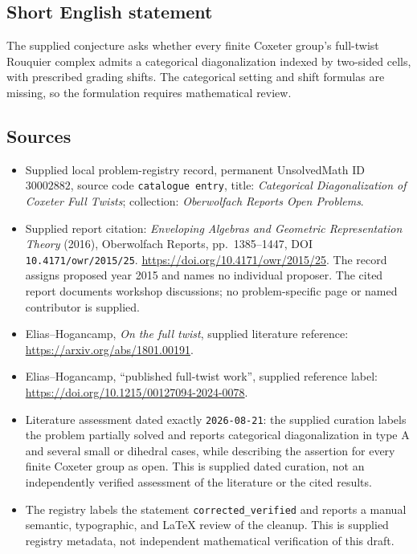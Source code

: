 \documentclass[11pt]{article}
\begin{document}
\subsection{Short English statement}
The supplied conjecture asks whether every finite Coxeter group's full-twist Rouquier complex admits a categorical diagonalization indexed by two-sided cells, with prescribed grading shifts. The categorical setting and shift formulas are missing, so the formulation requires mathematical review.
\subsection{Sources}
\begin{itemize}
\item Supplied local problem-registry record, permanent UnsolvedMath ID \(30002882\), source code \texttt{catalogue entry}, title: \emph{Categorical Diagonalization of Coxeter Full Twists}; collection: \emph{Oberwolfach Reports Open Problems}.
\item Supplied report citation: \emph{Enveloping Algebras and Geometric Representation Theory} (2016), Oberwolfach Reports, pp.~1385--1447, DOI \texttt{10.4171/owr/2015/25}. \url{https://doi.org/10.4171/owr/2015/25}. The record assigns proposed year 2015 and names no individual proposer. The cited report documents workshop discussions; no problem-specific page or named contributor is supplied.
\item Elias--Hogancamp, \emph{On the full twist}, supplied literature reference: \url{https://arxiv.org/abs/1801.00191}.
\item Elias--Hogancamp, ``published full-twist work'', supplied reference label: \url{https://doi.org/10.1215/00127094-2024-0078}.
\item Literature assessment dated exactly \texttt{2026-08-21}: the supplied curation labels the problem partially solved and reports categorical diagonalization in type A and several small or dihedral cases, while describing the assertion for every finite Coxeter group as open. This is supplied dated curation, not an independently verified assessment of the literature or the cited results.
\item The registry labels the statement \texttt{corrected\_verified} and reports a manual semantic, typographic, and LaTeX review of the cleanup. This is supplied registry metadata, not independent mathematical verification of this draft.
\end{itemize}
\end{document}
